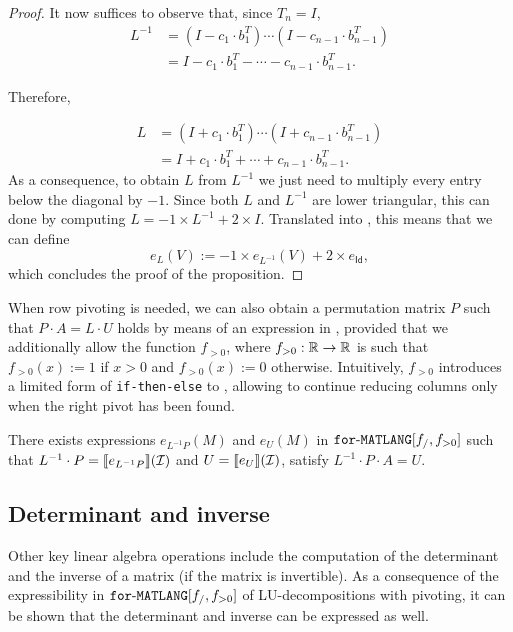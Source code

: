\begin{proof}
    It now suffices to observe that, since $T_n=I$,
    \begin{align*}
    L^{-1}&=(I-c_1\cdot b_1^T)\cdots (I-c_{n-1}\cdot  b_{n-1}^T) \\
    &=I-c_1\cdot b_1^T-\cdots - c_{n-1}\cdot b_{n-1}^T.
    \end{align*}
    
	Therefore,    
    
    \begin{align*}
    L&=(I+c_1\cdot b_1^T)\cdots (I+c_{n-1}\cdot b_{n-1}^T) \\
    &=I+c_1\cdot b_1^T+\cdots + c_{n-1}\cdot b_{n-1}^T.
    \end{align*}
    As a consequence, to obtain $L$ from $L^{-1}$ we just need to multiply every entry below the diagonal by $-1$. Since both  $L$ and $L^{-1}$ are lower triangular, this can done 
    by computing $L=-1\times L^{-1} + 2\times I$. Translated into \langfor, this means that we can define
    $$
    e_{L}(V) :=  -1\times e_{L^{-1}}(V) + 2\times e_{\mathsf{Id}},
    $$
    which concludes the proof of the proposition.    
\end{proof}



\smallskip

When row pivoting is needed, we can also obtain a permutation matrix
$P$ such that $P\cdot A=L\cdot U$ holds by means of an expression in \langfor, provided
that we additionally allow the function $f_{>0}$, 
where $f_{>0}:\mathbb{R}\to\mathbb{R}$ is such that $f_{>0}(x):=1$ if $x>0$ and $f_{>0}(x):=0$ otherwise.
Intuitively, $f_{>0}$ introduces a limited form of \texttt{if-then-else} to \langfor, allowing to continue reducing columns only when the right pivot has been found.

\begin{proposition}\label{prop:palu}
There exists expressions $e_{L^{-1}P}(M)$ and $e_U(M)$ in $\texttt{for}\text{-}\texttt{MATLANG}[f_/,f_{>0}]$  such that
$L^{-1}\cdot P=\llbracket e_{L^{-1}P} \rrbracket(\mathcal{I})$ and $U=\llbracket e_U \rrbracket(\mathcal{I})$, satisfy $L^{-1}\cdot P\cdot A=U$.
\end{proposition}




\subsection{Determinant and inverse}\label{sec:queries:inverse}
Other key linear algebra operations include the computation of the determinant and
the inverse of a matrix (if the matrix is invertible). As a consequence of the expressibility
in $\texttt{for}\text{-}\texttt{MATLANG}[f_/,f_{>0}]$ of LU-decompositions with pivoting, it can be shown that the determinant
and inverse can be expressed as well. 

